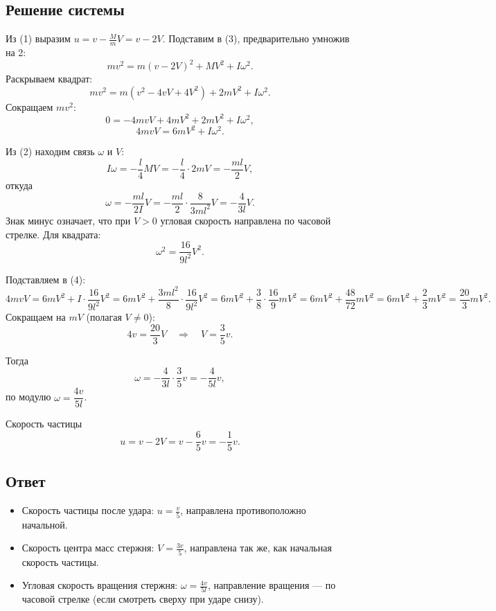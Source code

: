 \documentclass[a4paper,12pt]{article}
\begin{document}
\subsection*{Решение системы}
Из (1) выразим $u = v - \frac{M}{m}V = v - 2V$.
Подставим в (3), предварительно умножив на 2:
\[
mv^2 = m(v-2V)^2 + MV^2 + I\omega^2.
\]
Раскрываем квадрат:
\[
mv^2 = m(v^2 - 4vV + 4V^2) + 2mV^2 + I\omega^2.
\]
Сокращаем $mv^2$:
\[
0 = -4mvV + 4mV^2 + 2mV^2 + I\omega^2,
\]
\[
4mvV = 6mV^2 + I\omega^2. \tag{4}
\]

Из (2) находим связь $\omega$ и $V$:
\[
I\omega = -\frac{l}{4}MV = -\frac{l}{4}\cdot 2m V = -\frac{ml}{2}V,
\]
откуда
\[
\omega = -\frac{ml}{2I}V = -\frac{ml}{2}\cdot\frac{8}{3ml^2}V = -\frac{4}{3l}V.
\]
Знак минус означает, что при $V>0$ угловая скорость направлена по часовой стрелке.
Для квадрата:
\[
\omega^2 = \frac{16}{9l^2}V^2.
\]

Подставляем в (4):
\[
4mvV = 6mV^2 + I\cdot\frac{16}{9l^2}V^2 = 6mV^2 + \frac{3ml^2}{8}\cdot\frac{16}{9l^2}V^2
= 6mV^2 + \frac{3}{8}\cdot\frac{16}{9}mV^2 = 6mV^2 + \frac{48}{72}mV^2 = 6mV^2 + \frac{2}{3}mV^2 = \frac{20}{3}mV^2.
\]
Сокращаем на $mV$ (полагая $V\neq0$):
\[
4v = \frac{20}{3}V \quad\Rightarrow\quad V = \frac{3}{5}v.
\]

Тогда
\[
\omega = -\frac{4}{3l}\cdot\frac{3}{5}v = -\frac{4}{5l}v,
\]
по модулю $\omega = \dfrac{4v}{5l}$.

Скорость частицы
\[
u = v - 2V = v - \frac{6}{5}v = -\frac{1}{5}v.
\]

\subsection*{Ответ}
\begin{itemize}
    \item Скорость частицы после удара: $\displaystyle u = \frac{v}{5}$,
    направлена противоположно начальной.
    \item Скорость центра масс стержня: $\displaystyle V = \frac{3v}{5}$,
    направлена так же, как начальная скорость частицы.
    \item Угловая скорость вращения стержня: $\displaystyle \omega = \frac{4v}{5l}$,
    направление вращения — по часовой стрелке (если смотреть сверху при ударе снизу).
\end{itemize}
\end{document}
